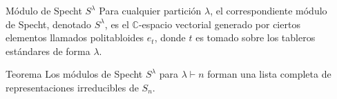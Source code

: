\documentclass[final,xcolor=svgnames]{beamer}
\DeclareMathOperator{\sgn}{sgn}
\begin{document}
\begin{frame}{}
\begin{columns}
\begin{column}{0.5\textwidth}
      \begin{block}{Módulo de Specht $S^{\lambda}$}
        Para cualquier partición $\lambda$, el correspondiente
        \alert{módulo de Specht}, denotado $S^{\lambda}$, es el
        $\mathbb{C}$-espacio vectorial generado por ciertos elementos llamados
        politabloides $e_{t}$, donde $t$ es tomado sobre los
        tableros estándares de forma
        $\lambda$.

      \end{block} 

       \begin{block}{Teorema}
         Los módulos de Specht $S^{\lambda}$ para $\lambda\vdash n$
         forman una lista completa de representaciones irreducibles de
         $S_{n}$.
     \end{block}
    \end{column}

    \begin{column}{0.5\textwidth}
      
        
        

\end{column}
\end{columns}
\end{frame}
\end{document}
